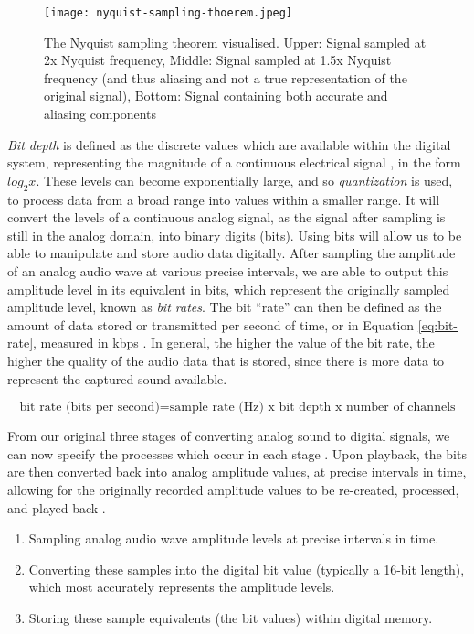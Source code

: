 \begin{figure}[ht]
  \centering
  \texttt{[image: nyquist-sampling-thoerem.jpeg]}
  \caption{The Nyquist sampling theorem visualised. Upper: Signal sampled at 2x Nyquist frequency, Middle: Signal sampled at 1.5x Nyquist frequency (and thus aliasing and not a true representation of the original signal), Bottom: Signal containing both accurate and aliasing components}\cite{Zjalic_2021}
  \label{fig:nyquist-sampling-theorem}
\end{figure}

\textit{Bit depth} is defined as the discrete values which are available within the digital system, representing the magnitude of a continuous electrical signal \cite{Zjalic_2021}, in the form $log_2{x}$. These levels can become exponentially large, and so \textit{quantization} is used, to process data from a broad range into values within a smaller range. It will convert the levels of a continuous analog signal, as the signal after sampling is still in the analog domain, into binary digits (bits). Using bits will allow us to be able to manipulate and store audio data digitally. After sampling the amplitude of an analog audio wave at various precise intervals, we are able to output this amplitude level in its equivalent in bits, which represent the originally sampled amplitude level, known as \textit{bit rates}. The bit ``rate'' can then be defined as the amount of data stored or transmitted per second of time, or in Equation \ref{eq:bit-rate}, measured in kbps \cite{Zjalic_2021}. In general, the higher the value of the bit rate, the higher the quality of the audio data that is stored, since there is more data to represent the captured sound available.

\begin{equation}
	\textrm{bit rate (bits per second)} = \textrm{sample rate (Hz) x } \textrm{bit depth x } \textrm{number of channels}
	\label{eq:bit-rate}	
\end{equation}

From our original three stages of converting analog sound to digital signals, we can now specify the processes which occur in each stage \cite{Huber_Runstein_2018}. Upon playback, the bits are then converted back into analog amplitude values, at precise intervals in time, allowing for the originally recorded amplitude values to be re-created, processed, and played back \cite{Huber_Runstein_2018}. 

\begin{enumerate}
	\item Sampling analog audio wave amplitude levels at precise intervals in time.
	\item Converting these samples into the digital bit value (typically a 16-bit length), which most accurately represents the amplitude levels.
	\item Storing these sample equivalents (the bit values) within digital memory.
\end{enumerate}


